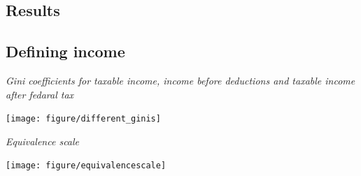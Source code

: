 \documentclass[twoside]{article}\usepackage[]{graphicx}\usepackage[]{color}
\newenvironment{knitrout}{}{} %
\begin{document}
\begin{multicols}{2}








\section{Results}



\subsection{Defining income}

\emph{Gini coefficients for taxable income, income before deductions and taxable income after fedaral tax}



\begin{knitrout}
\color{fgcolor}
\texttt{[image: figure/different\_ginis]} 

\end{knitrout}

\emph{Equivalence scale}



\begin{knitrout}
\color{fgcolor}
\texttt{[image: figure/equivalencescale]} 

\end{knitrout}


\end{multicols}
\end{document}
